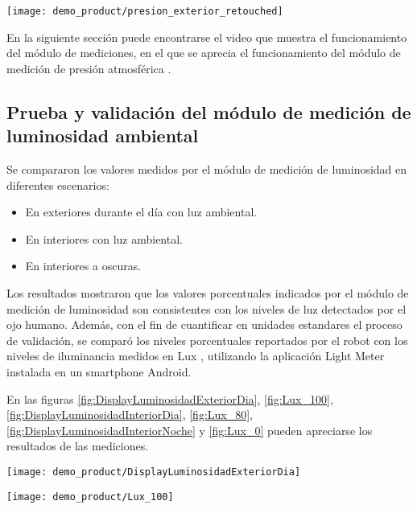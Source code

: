 \begin{center}
\texttt{[image: demo\_product/presion\_exterior\_retouched]}
  \label{fig:humedad_interior}
\end{center}


En la siguiente sección puede encontrarse el video que muestra el funcionamiento del módulo de mediciones, en el que se aprecia el funcionamiento del módulo de medición de presión atmosférica \cite{Demo_Mediciones}.

\subsection{Prueba y validación del módulo de medición de luminosidad ambiental}

Se compararon los valores medidos por el módulo de medición de luminosidad en diferentes escenarios:

\begin{itemize}
	\item En exteriores durante el día con luz ambiental.
	\item En interiores con luz ambiental.
	\item En interiores a oscuras.
\end{itemize}

Los resultados mostraron que los valores porcentuales indicados por el módulo de medición de luminosidad son consistentes con los niveles de luz detectados por el ojo humano. Además, con el fin de cuantificar en unidades estandares el proceso de validación, se comparó los niveles porcentuales reportados por el robot con los niveles de iluminancia medidos en Lux \cite{Wikipedia_Lux}, utilizando la aplicación Light Meter \cite{Playstore_Lightmeter} instalada en un smartphone Android. 

En las figuras \ref{fig:DisplayLuminosidadExteriorDia}, \ref{fig:Lux_100}, \ref{fig:DisplayLuminosidadInteriorDia}, \ref{fig:Lux_80}, \ref{fig:DisplayLuminosidadInteriorNoche} y \ref{fig:Lux_0} pueden apreciarse los resultados de las mediciones.

\begin{center}
\texttt{[image: demo\_product/DisplayLuminosidadExteriorDia]}
  \label{fig:DisplayLuminosidadExteriorDia}
\end{center}

\begin{center}
\texttt{[image: demo\_product/Lux\_100]}
  \label{fig:Lux_100}
\end{center}

